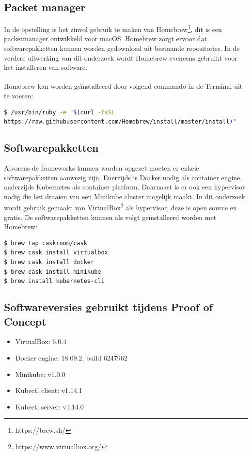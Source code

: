 \subsection{Packet manager}
In de opstelling is het zinvol gebruik te maken van Homebrew\footnote{https://brew.sh/}, dit is een packetmanager ontwikkeld voor macOS. Homebrew zorgt ervoor dat softwarepakketten kunnen worden gedownload uit bestaande repositories. In de verdere uitwerking van dit onderzoek wordt Homebrew eveneens gebruikt voor het installeren van software.
\\\\
Homebrew kan worden geïnstalleerd door volgend commando in de Terminal uit te voeren: 
\begin{lstlisting}[language=bash]
$ /usr/bin/ruby -e "$(curl -fsSL 
https://raw.githubusercontent.com/Homebrew/install/master/install)"
\end{lstlisting}

\subsection{Softwarepakketten}
\label{sec:software}
Alvorens de frameworks kunnen worden opgezet moeten er enkele softwarepakketten aanwezig zijn. Enerzijds is Docker nodig als container engine, anderzijds Kubernetes als container platform. Daarnaast is er ook een hypervisor nodig die het draaien van een Minikube cluster mogelijk maakt. In dit onderzoek wordt gebruik gemaakt van VirtualBox\footnote{https://www.virtualbox.org/} als hypervisor, deze is open source en gratis. De softwarepakketten kunnen als volgt geïnstalleerd worden met Homebrew:        
\begin{lstlisting}[language=bash]
$ brew tap caskroom/cask
$ brew cask install virtualbox
$ brew cask install docker
$ brew cask install minikube
$ brew install kubernetes-cli
\end{lstlisting}

\newpage
\subsection{Softwareversies gebruikt tijdens Proof of Concept}
\begin{itemize}
    \item VirtualBox: 6.0.4 
    \item Docker engine: 18.09.2, build 6247962
    \item Minikube: v1.0.0
    \item Kubectl client: v1.14.1
    \item Kubectl server: v1.14.0
\end{itemize}

